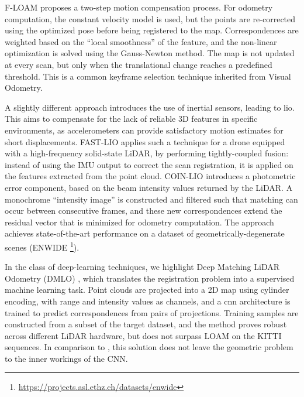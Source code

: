 F-LOAM \cite{wang2021f} proposes a two-step motion compensation process. For odometry computation, the constant velocity model is used, but the points are re-corrected using the optimized pose before being registered to the map. Correspondences are weighted based on the ``local smoothness'' of the feature, and the non-linear optimization is solved using the Gauss-Newton method. The map is not updated at every scan, but only when the translational change reaches a predefined threshold. This is a common \gls{keyframe} selection technique inherited from Visual Odometry.

A slightly different approach introduces the use of inertial sensors, leading to \acrfull{lio}. This aims to compensate for the lack of reliable 3D features in specific environments, as accelerometers can provide satisfactory motion estimates for short displacements. FAST-LIO \cite{fastlio} applies such a technique for a drone equipped with a high-frequency solid-state LiDAR, by performing tightly-coupled fusion: instead of using the IMU output to correct the scan registration, it is applied on the features extracted from the point cloud. COIN-LIO \cite{pfreundschuh2024coin} introduces a photometric error component, based on the beam intensity values returned by the LiDAR. A monochrome ``intensity image'' is constructed and filtered such that matching can occur between consecutive frames, and these new correspondences extend the residual vector that is minimized for odometry computation. The approach achieves state-of-the-art performance on a dataset of geometrically-degenerate scenes (ENWIDE \footnote{\url{https://projects.asl.ethz.ch/datasets/enwide}}).


In the class of deep-learning techniques, we highlight Deep Matching LiDAR Odometry (DMLO) \cite{li2020dmlo}, which translates the registration problem into a supervised machine learning task. Point clouds are projected into a 2D map using cylinder encoding, with range and intensity values as channels, and a \acrfull{cnn} architecture is trained to predict correspondences from pairs of projections. Training samples are constructed from a subset of the target dataset, and the method proves robust across different LiDAR hardware, but does not surpass LOAM on the KITTI sequences. In comparison to \cite{li2019net}, this solution does not leave the geometric problem to the inner workings of the CNN.


